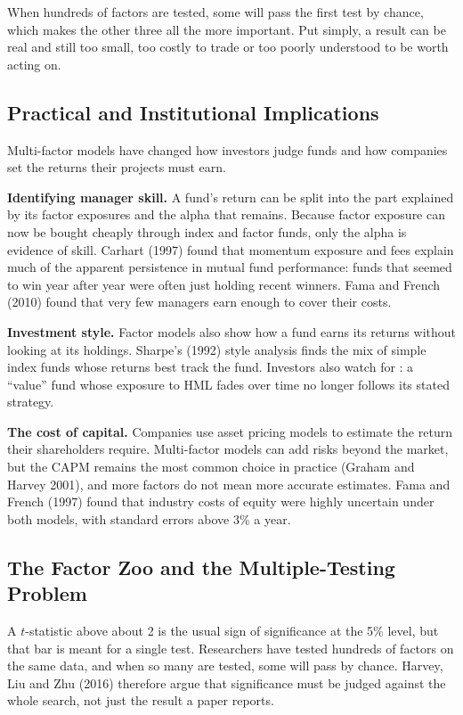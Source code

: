 When hundreds of factors are tested, some will pass the first test by chance, which makes the other three all the more important. Put simply, a result can be real and still too small, too costly to trade or too poorly understood to be worth acting on.


\subsection{Practical and Institutional Implications}
\label{sec:04-implications}

Multi-factor models have changed how investors judge funds and how companies set the returns their projects must earn.

\textbf{Identifying manager skill.} A fund's return can be split into the part explained by its factor exposures and the alpha that remains. Because factor exposure can now be bought cheaply through index and factor funds, only the alpha is evidence of skill. Carhart (1997) found that momentum exposure and fees explain much of the apparent persistence in mutual fund performance: funds that seemed to win year after year were often just holding recent winners. Fama and French (2010) found that very few managers earn enough to cover their costs.

\textbf{Investment style.} Factor models also show how a fund earns its returns without looking at its holdings. Sharpe's (1992) style analysis finds the mix of simple index funds whose returns best track the fund. Investors also watch for : a ``value'' fund whose exposure to HML fades over time no longer follows its stated strategy.

\textbf{The cost of capital.} Companies use asset pricing models to estimate the return their shareholders require. Multi-factor models can add risks beyond the market, but the CAPM remains the most common choice in practice (Graham and Harvey 2001), and more factors do not mean more accurate estimates. Fama and French (1997) found that industry costs of equity were highly uncertain under both models, with standard errors above 3\% a year.


\subsection{The Factor Zoo and the Multiple-Testing Problem}
\label{sec:04-multiple-testing}

A $t$-statistic above about 2 is the usual sign of significance at the 5\% level, but that bar is meant for a single test. Researchers have tested hundreds of factors on the same data, and when so many are tested, some will pass by chance. Harvey, Liu and Zhu (2016) therefore argue that significance must be judged against the whole search, not just the result a paper reports.

